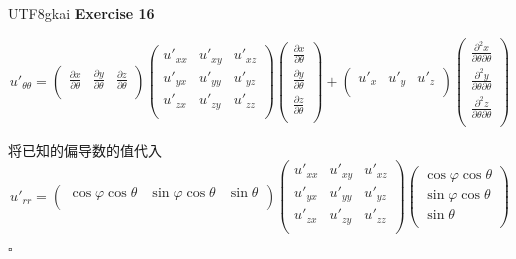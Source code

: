 \documentclass{article}
\newenvironment{exercise}[1]{%
{\textbf{Exercise #1} \\ 
    }
}{
  \hfill $\square$ 
  \par\bigskip 
}
\begin{document}
\begin{CJK}{UTF8}{gkai}
\begin{exercise}{16}
    \[u'_{\theta\theta} = \begin{pmatrix}
        \frac{\partial x}{\partial \theta}&\frac{\partial y}{\partial \theta}&\frac{\partial z}{\partial \theta}\\ 
    \end{pmatrix}
    \begin{pmatrix}
        u'_{xx}&u'_{xy}&u'_{xz}\\
        u'_{yx}&u'_{yy}&u'_{yz}\\
        u'_{zx}&u'_{zy}&u'_{zz}\\
    \end{pmatrix}
    \begin{pmatrix}
        \frac{\partial x}{\partial \theta}\\\frac{\partial y}{\partial \theta}\\\frac{\partial z}{\partial \theta}\\ 
    \end{pmatrix}
    +
    \begin{pmatrix}
        u'_x&u'_y&u'_z\\
    \end{pmatrix}
    \begin{pmatrix}
        \frac{\partial^2 x}{\partial \theta\partial \theta}\\\frac{\partial^2 y}{\partial \theta\partial \theta}\\\frac{\partial^2 z}{\partial \theta\partial \theta}\\        
    \end{pmatrix}
    \]

    将已知的偏导数的值代入
    \[u'_{rr} = \begin{pmatrix}
        \cos \varphi \cos \theta&\sin \varphi \cos \theta&\sin \theta\\ 
    \end{pmatrix}
    \begin{pmatrix}
        u'_{xx}&u'_{xy}&u'_{xz}\\
        u'_{yx}&u'_{yy}&u'_{yz}\\
        u'_{zx}&u'_{zy}&u'_{zz}\\
    \end{pmatrix}
    \begin{pmatrix}
        \cos \varphi \cos \theta\\\sin \varphi \cos \theta\\\sin \theta\\ 
    \end{pmatrix}
    \]


\end{exercise}
\end{CJK}
\end{document}
